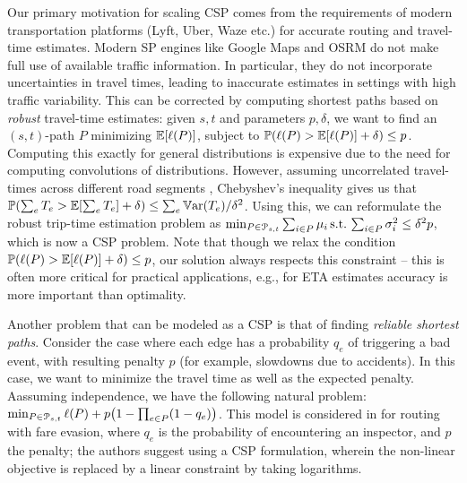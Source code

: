 Our primary motivation for scaling CSP comes from the requirements of modern transportation platforms (Lyft, Uber, Waze etc.) for accurate routing and travel-time estimates.
Modern SP engines like Google Maps and OSRM do not make full use of available traffic information.
In particular, they do not incorporate uncertainties in travel times, leading to inaccurate estimates in settings with high traffic variability.
This can be corrected by computing shortest paths based on \emph{robust} travel-time estimates:
given $s,t$ and parameters $p,\delta$, we want to find an $(s,t)$-path $P$ minimizing $\mathbb{E}[\ell(P)]$, subject to $\mathbb{P}(\ell(P)>\mathbb{E}[\ell(P)]+\delta)\leq p$.
Computing this exactly for general distributions is expensive due to the need for computing convolutions of distributions. 
However, assuming uncorrelated travel-times across different road segments , Chebyshev's inequality gives us that $\mathbb{P}(\sum_eT_e>\mathbb{E}[\sum_eT_e]+\delta)\leq \sum_e\mathbb{V}\textnormal{ar}(T_e)/\delta^2$. Using this, we can reformulate the robust trip-time estimation problem as 
$\min_{ P\in\mathcal{P}_{s,t}}\sum_{i\in P}\mu_i \, \mbox{s.t.}\, \sum_{i\in P}\sigma^2_i\leq \delta^2p$, which is now a CSP problem. 
Note that though we relax the condition $\mathbb{P}(\ell(P)>\mathbb{E}[\ell(P)]+\delta)\leq p$, our solution always respects this constraint -- this is often more critical for practical applications, e.g., for ETA estimates accuracy is more important than optimality.

Another problem that can be modeled as a CSP is that of finding \emph{reliable shortest paths}.
Consider the case where each edge has a probability $q_e$ of triggering a bad event, with resulting penalty $p$ (for example, slowdowns due to accidents).
In this case, we want to minimize the travel time as well as the expected penalty.
Aassuming independence, we have the following natural problem:
$\min_{P\in\Pst} \ell(P)+p\prn*{1-\prod_{e\in P}(1-q_e)}$.
This model is considered in \cite{fareevasion} for routing with fare evasion, where $q_e$ is the probability of encountering an inspector, and $p$ the penalty; the authors suggest using a CSP formulation, wherein the non-linear objective is replaced by a linear constraint by taking logarithms.


